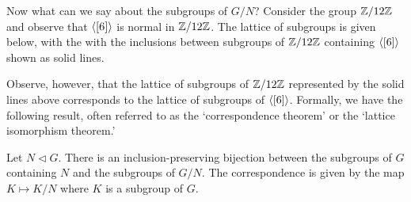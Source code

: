 Now what can we say about the subgroups of \(G/N\)? Consider the group
\(\mathbb{Z}/12\mathbb{Z}\) and observe that \(\langle [6] \rangle\) is normal in \(\mathbb{Z}/12\mathbb{Z}\). The lattice
of subgroups is given below, with the with the inclusions between subgroups of
\(\mathbb{Z}/12\mathbb{Z}\) containing \(\langle [6] \rangle\) shown as solid lines.
\begin{center}
\end{center}
Observe, however, that the lattice of subgroups of \(\mathbb{Z}/12\mathbb{Z}\) represented by
the solid lines above corresponds to the lattice of subgroups of \(\langle [6] \rangle\).
Formally, we have the following result, often referred to as the `correspondence
theorem' or the `lattice isomorphism theorem.'

\begin{theorem}
    \label{thm:correspondence-theorem-group}
    Let \(N \triangleleft G\). There is an inclusion-preserving bijection
    between the subgroups of \(G\) containing \(N\) and the subgroups of
    \(G/N\). The correspondence is given by the map \(K \mapsto K/N\) where
    \(K\) is a subgroup of \(G\).
\end{theorem}

